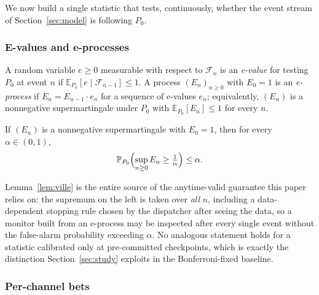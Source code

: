 \documentclass[trsc,dblanonrev]{informs4}
\newcommand{\E}{\mathbb{E}}
\newcommand{\Prob}{\mathbb{P}}
\newcommand{\F}{\mathcal{F}}
\begin{document}
We now build a single statistic that tests, continuously, whether the
event stream of Section~\ref{sec:model} is following $P_0$.

\subsubsection{E-values and e-processes}

\begin{definition}\label{def:evalue}
A random variable $e \ge 0$ measurable with respect to $\F_n$ is an
\emph{e-value} for testing $P_0$ at event $n$ if
$\E_{P_0}[e \mid \F_{n-1}] \le 1$. A process $(E_n)_{n \ge 0}$ with
$E_0 = 1$ is an \emph{e-process} if $E_n = E_{n-1} \cdot e_n$ for a
sequence of e-values $e_n$; equivalently, $(E_n)$ is a nonnegative
supermartingale under $P_0$ with $\E_{P_0}[E_n] \le 1$ for every $n$.
\end{definition}

\begin{lemma}\label{lem:ville}
If $(E_n)$ is a nonnegative supermartingale with $E_0 = 1$, then for
every $\alpha \in (0,1)$,
\begin{equation}\label{eq:ville}
\Prob_{P_0}\Bigl(\sup_{n \ge 0} E_n \ge \tfrac{1}{\alpha}\Bigr) \le \alpha.
\end{equation}
\end{lemma}

Lemma~\ref{lem:ville} is the entire source of the anytime-valid
guarantee this paper relies on: the supremum on the left is taken over
\emph{all} $n$, including a data-dependent stopping rule chosen by the
dispatcher after seeing the data, so a monitor built from an e-process
may be inspected after every single event without the false-alarm
probability exceeding $\alpha$. No analogous statement holds for a
statistic calibrated only at pre-committed checkpoints, which is
exactly the distinction Section~\ref{sec:study} exploits in the
Bonferroni-fixed baseline.

\subsubsection{Per-channel bets}
\end{document}
